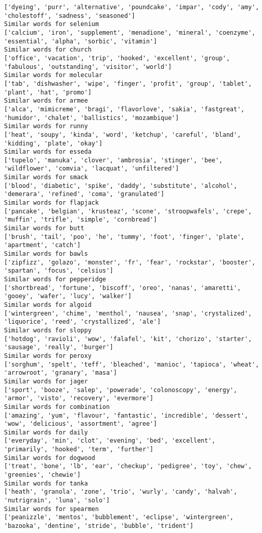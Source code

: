 \documentclass[11pt]{article}
\begin{document}
\begin{Verbatim}[commandchars=\\\{\}]
['dyeing', 'purr', 'alternative', 'poundcake', 'impar', 'cody', 'amy', 'cholestoff', 'sadness', 'seasoned']
Similar words for selenium
['calcium', 'iron', 'supplement', 'menadione', 'mineral', 'coenzyme', 'essential', 'alpha', 'sorbic', 'vitamin']
Similar words for church
['office', 'vacation', 'trip', 'hooked', 'excellent', 'group', 'fabulous', 'outstanding', 'visitor', 'world']
Similar words for molecular
['tab', 'dishwasher', 'wipe', 'finger', 'profit', 'group', 'tablet', 'plant', 'hat', 'promo']
Similar words for armee
['alca', 'mimicreme', 'bragi', 'flavorlove', 'sakia', 'fastgreat', 'humidor', 'chalet', 'ballistics', 'mozambique']
Similar words for runny
['heat', 'soupy', 'kinda', 'word', 'ketchup', 'careful', 'bland', 'kidding', 'plate', 'okay']
Similar words for esseda
['tupelo', 'manuka', 'clover', 'ambrosia', 'stinger', 'bee', 'wildflower', 'comvia', 'lacquat', 'unfiltered']
Similar words for smack
['blood', 'diabetic', 'spike', 'daddy', 'substitute', 'alcohol', 'demerara', 'refined', 'coma', 'granulated']
Similar words for flapjack
['pancake', 'belgian', 'krusteaz', 'scone', 'stroopwafels', 'crepe', 'muffin', 'trifle', 'simple', 'cornbread']
Similar words for butt
['brush', 'tail', 'poo', 'he', 'tummy', 'foot', 'finger', 'plate', 'apartment', 'catch']
Similar words for bawls
['zipfizz', 'golazo', 'monster', 'fr', 'fear', 'rockstar', 'booster', 'spartan', 'focus', 'celsius']
Similar words for pepperidge
['shortbread', 'fortune', 'biscoff', 'oreo', 'nanas', 'amaretti', 'gooey', 'wafer', 'lucy', 'walker']
Similar words for algoid
['wintergreen', 'chime', 'menthol', 'nausea', 'snap', 'crystalized', 'liquorice', 'reed', 'crystallized', 'ale']
Similar words for sloppy
['hotdog', 'ravioli', 'wow', 'falafel', 'kit', 'chorizo', 'starter', 'sausage', 'really', 'burger']
Similar words for peroxy
['sorghum', 'spelt', 'teff', 'bleached', 'manioc', 'tapioca', 'wheat', 'arrowroot', 'granary', 'masa']
Similar words for jager
['sport', 'booze', 'salep', 'powerade', 'colonoscopy', 'energy', 'armor', 'visto', 'recovery', 'evermore']
Similar words for combination
['amazing', 'yum', 'flavour', 'fantastic', 'incredible', 'dessert', 'wow', 'delicious', 'assortment', 'agree']
Similar words for daily
['everyday', 'min', 'clot', 'evening', 'bed', 'excellent', 'primarily', 'hooked', 'term', 'further']
Similar words for dogwood
['treat', 'bone', 'lb', 'ear', 'checkup', 'pedigree', 'toy', 'chew', 'greenies', 'chewie']
Similar words for tanka
['heath', 'granola', 'zone', 'trio', 'wurly', 'candy', 'halvah', 'nutrigrain', 'luna', 'solo']
Similar words for spearmen
['peanizzle', 'mentos', 'bubblement', 'eclipse', 'wintergreen', 'bazooka', 'dentine', 'stride', 'bubble', 'trident']

\end{Verbatim}
\end{document}
